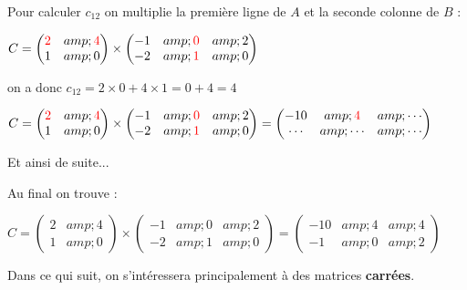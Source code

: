{     Pour calculer $c_{12}$ on multiplie la première ligne de $A$ et la seconde colonne de $B$ :
     \par
     $C=\begin{pmatrix} \color{red}{2} &amp; \color{red}{4} \\ 1 &amp; 0\end{pmatrix}\times\begin{pmatrix}-1 &amp; \color{red}{0} &amp; 2 \\ -2 &amp; \color{red}{1} &amp; 0\end{pmatrix}$
     \par
     on a donc $c_{12}=2\times 0+4\times 1=0+4=4$
     \par
     $C=\begin{pmatrix} \color{red}{2} &amp; \color{red}{4} \\ 1 &amp; 0\end{pmatrix}\times \begin{pmatrix} -1 &amp; \color{red}{0} &amp; 2 \\ -2 &amp; \color{red}{1} &amp; 0\end{pmatrix}=\begin{pmatrix}-10 &amp; \color{red}{4} &amp; \cdots \\ \cdots &amp; \cdots &amp; \cdots \end{pmatrix}$
     \par
     Et ainsi de suite...
     \par
     Au final on trouve :
     \par
     $C=\begin{pmatrix} 2 &amp; 4 \\ 1 &amp; 0\end{pmatrix}\times \begin{pmatrix}-1 &amp; 0 &amp; 2 \\ -2 &amp; 1 &amp; 0\end{pmatrix}=\begin{pmatrix}-10 &amp; 4 &amp; 4 \\ -1 &amp; 0 &amp; 2 \end{pmatrix}$
}
Dans ce qui suit, on s'intéressera principalement à des matrices \textbf{carrées}.
